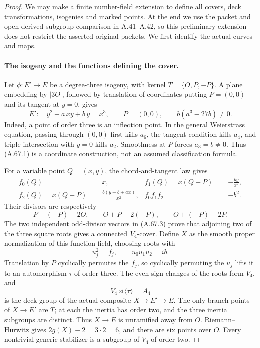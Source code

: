 \begin{proof}
We may make a finite number-field extension to define all covers,
deck transformations, isogenies and marked points. At the end we
use the packet and open-derived-subgroup comparison in A.41--A.42,
so this preliminary extension does not restrict the asserted
original packets. We first identify the actual curves and maps.

\paragraph{The isogeny and the functions defining the cover.}
Let \(\phi:E'\to E\) be a degree-three isogeny, with kernel
\(T=\{O,P,-P\}\). A plane embedding by \(|3O|\), followed by
translation of coordinates putting \(P=(0,0)\) and its tangent
at \(y=0\), gives
\[
 E':\quad y^2+a\,xy+b\,y=x^3,\qquad P=(0,0),
 \qquad b(a^3-27b)\ne0.                                      \tag{A.67.1}
\]
Indeed, a point of order three is an inflection point. In the
general Weierstrass equation, passing through \((0,0)\) first
kills \(a_6\), the tangent condition kills \(a_4\), and triple
intersection with \(y=0\) kills \(a_2\). Smoothness at \(P\)
forces \(a_3=b\ne0\). Thus (A.67.1) is a coordinate construction,
not an assumed classification formula.

For a variable point \(Q=(x,y)\), the chord-and-tangent law gives
\[
\begin{split}
 f_0(Q)&=x,&
 f_1(Q)=x(Q+P)&=-\frac{by}{x^2},\\
 f_2(Q)=x(Q-P)&=\frac{b(y+b+ax)}{x^2},&
 f_0f_1f_2&=-b^2.
\end{split}                                                   \tag{A.67.2}
\]
Their divisors are respectively
\[
 P+(-P)-2O,\qquad O+P-2(-P),\qquad O+(-P)-2P.
                                                               \tag{A.67.3}
\]
The two independent odd-divisor vectors in (A.67.3) prove that
adjoining two of the three square roots gives a connected
\(V_4\)-cover. Define \(X\) as the smooth proper normalization
of this function field, choosing roots with
\[
 u_j^2=f_j,\qquad u_0u_1u_2=ib.
                                                               \tag{A.67.4}
\]
Translation by \(P\) cyclically permutes the \(f_j\), so cyclically
permuting the \(u_j\) lifts it to an automorphism \(\tau\) of order
three. The even sign changes of the roots form \(V_4\), and
\[
 V_4\rtimes\langle\tau\rangle=A_4
                                                               \tag{A.67.5}
\]
is the deck group of the actual composite \(X\to E'\to E\).
The only branch points of \(X\to E'\) are \(T\); at each the
inertia has order two, and the three inertia subgroups are
distinct. Thus \(X\to E\) is unramified away from \(O\).
Riemann--Hurwitz gives \(2g(X)-2=3\cdot2=6\), and there are six
points over \(O\). Every nontrivial generic stabilizer is a
subgroup of \(V_4\) of order two.


\end{proof}
